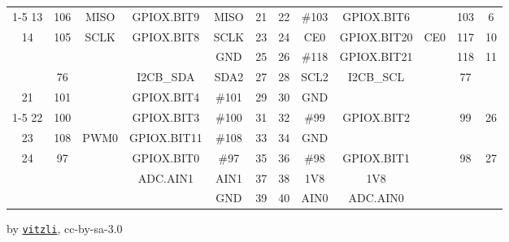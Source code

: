 \documentclass[a4paper,12pt]{article}
\newcommand{\tFPWM}[1]{\textcolor{clPWM}{#1}}
\newcommand{\tFSPI}[1]{\textcolor{clSPI}{#1}}
\newcommand{\tFIIC}[1]{\textcolor{clIIC}{#1}}
\newcommand{\sepline}{\cline{1-5}\cline{8-12}}
\newcommand{\cpwr}{\cellcolor{pwrcolor}}
\newcommand{\cgpio}{\cellcolor{gpiocolor}}
\newcommand{\cspc}{\cellcolor{specialcolor}}
\newcommand{\tfl}{\textendash}
\begin{document}
\begin{center}
\begin{tabular}{ccccc|cc|ccccc}
\sepline
 13    & 106    & \tFSPI{MISO}    & GPIOX.BIT9     & MISO  & \cgpio{}21    & \cgpio{}22   & \#103 & GPIOX.BIT6     &                 & 103    & 6     \\
 14    & 105    & \tFSPI{SCLK}    & GPIOX.BIT8     & SCLK  & \cgpio{}23    & \cgpio{}24   & CE0   & GPIOX.BIT20    & \tFSPI{CE0}     & 117    & 10    \\
 \tfl  & \tfl   &                 & \tfl           & GND   & \cpwr{}25     & \cgpio{}26   & \#118 & GPIOX.BIT21    &                 & 118    & 11    \\
 \tfl  & 76     &                 & \tFIIC{I2CB\_SDA}      & SDA2  & \cspc{}27     & \cspc{}28    & SCL2  & \tFIIC{I2CB\_SCL}      &                 & 77     & \tfl    \\
 21    & 101    &                 & GPIOX.BIT4     & \#101 & \cgpio{}29    & \cpwr{}30    & GND   & \tfl           &                 & \tfl   &       \\
\sepline
 22    & 100    &                 & GPIOX.BIT3     & \#100 & \cgpio{}31    & \cgpio{}32   & \#99  & GPIOX.BIT2     &                 & 99     & 26    \\
 23    & 108    & \tFPWM{PWM0}    & GPIOX.BIT11    & \#108 & \cgpio{}33    & \cpwr{}34    & GND   & \tfl           &                 & \tfl   & \tfl    \\
 24    & 97     &                 & GPIOX.BIT0     & \#97  & \cgpio{}35    & \cgpio{}36   & \#98  & GPIOX.BIT1     &                 & 98     & 27    \\
 \tfl  & \tfl   &                 & ADC.AIN1       & AIN1  & \cspc{}37     & \cpwr{}38    & 1V8   & 1V8            &                 & \tfl   & \tfl    \\
 \tfl  & \tfl   &                 & \tfl           & GND   & \cpwr{}39     & \cspc{}40    & AIN0  & ADC.AIN0       &                 & \tfl   & \tfl    \\
\hline
\end{tabular}
\end{center}

{\scriptsize{}\textcolor{madeby}{by \texttt{\href{http://github.com/vitzli}{vitzli}}, cc-by-sa-3.0}}
\end{document}
